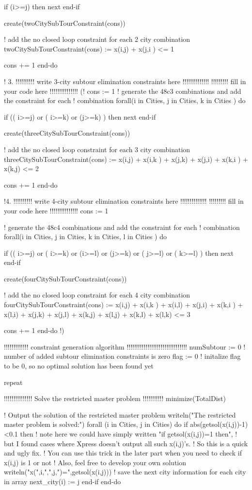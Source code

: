 \documentclass[twoside,12pt]{article}
\begin{document}
\begin{verbatim*}
 if (i>=j) then
   next
 end-if
  
 create(twoCitySubTourConstraint(cons))
 
 ! add the no closed loop constraint for each 2 city combination
 twoCitySubTourConstraint(cons) := x(i,j) + x(j,i ) <= 1
 
 cons += 1
end-do


! 3.
!!!!!!!!!! write 3-city subtour elimination constraints here !!!!!!!!!!!!!!
!!!!!!!!! fill in your code here !!!!!!!!!!!!!!!
(!
cons := 1
! generate the 48c3 combinations and add the constraint for each
! combination
forall(i in Cities, j in Cities, k in Cities ) do
 
 if (( i>=j) or ( i>=k) or (j>=k) ) then
 	next
 end-if
  
 create(threeCitySubTourConstraint(cons))
 
 ! add the no closed loop constraint for each 3 city combination
 threeCitySubTourConstraint(cons) :=  x(i,j) + x(i,k ) + x(j,k) +
 										x(j,i) + x(k,i ) + x(k,j) <= 2
 
 cons += 1
end-do

!4.
!!!!!!!!!! write 4-city subtour elimination constraints here !!!!!!!!!!!!!!
!!!!!!!!! fill in your code here !!!!!!!!!!!!!!!
cons := 1

! generate the 48c4 combinations and add the constraint for each
! combination
forall(i in Cities, j in Cities, k in Cities, l in Cities ) do
 
 if (( i>=j) or ( i>=k) or (i>=l) or (j>=k) or ( j>=l) or ( k>=l) ) then
 	next
 end-if
 
 create(fourCitySubTourConstraint(cons))
 
 ! add the no closed loop constraint for each 4 city combination
 fourCitySubTourConstraint(cons) :=  x(i,j) + x(i,k ) + x(i,l) + 
  										x(j,i) + x(k,i ) + x(l,i) + 
  										x(j,k) + x(j,l) +
  										x(k,j) + x(l,j) +
  										x(k,l) +
  										x(l,k) <= 3
  										
  cons += 1
end-do
!)

!!!!!!!!!!!!! constraint generation algorithm !!!!!!!!!!!!!!!!!!!!!!!!!!!!!!!!
numSubtour := 0   ! number of added subtour elimination constraints is zero
flag := 0 ! initalize flag to be 0, so no optimal solution has been found yet

repeat 
	
	!!!!!!!!!!!!!!! Solve the restricted master problem  !!!!!!!!!!!
	minimize(TotalDist)
	
	! Output the solution of the restricted master problem
	writeln("The restricted master problem is solved:")
	forall (i in Cities, j in Cities) do
		if abs(getsol(x(i,j))-1)<0.1 then  
		! note here we could have simply written "if getsol(x(i,j))=1 then", 
		! but I found cases where Xpress doesn't output all such x(i,j)'s. 
		! So this is a quick and ugly fix. 
		! You can use this trick in the later part when you need to check if x(i,j) is 1 or not
		! Also, feel free to develop your own solution
			writeln("x(",i,",",j,")=",getsol(x(i,j)))
		 ! save the next city information for each city in array
			next_city(i) := j
		end-if
	end-do
	

\end{verbatim*}
\end{document}

